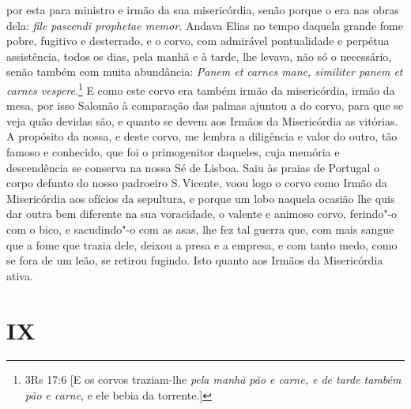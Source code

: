 por esta para ministro e irmão da sua misericórdia, senão porque o era
nas obras dela: \emph{file pascendi prophetae memor.} Andava Elias no
tempo daquela grande fome pobre, fugitivo e desterrado, e o corvo, com
admirável pontualidade e perpétua assistência, todos os dias, pela manhã
e à tarde, lhe levava, não só o necessário, senão também com muita
abundância: \emph{Panem et carnes mane, similiter panem et carnes vespere}.\footnote{3Rs 17:6 [E os corvos traziam-lhe \textit{pela manhã pão e carne, e de tarde também pão e carne}, e ele bebia da torrente.]} E como este corvo
era também irmão da misericórdia, irmão da mesa, por isso Salomão à
comparação das palmas ajuntou a do corvo, para que se veja quão devidas
são, e quanto se devem aos Irmãos da Misericórdia as vitórias. A
propósito da nossa, e deste corvo, me lembra a diligência e valor do
outro, tão famoso e conhecido, que foi o primogenitor daqueles, cuja
memória e descendência se conserva na nossa Sé de Lisboa. Saiu às praias
de Portugal o corpo defunto do nosso padroeiro S.\,Vicente, voou logo o
corvo como Irmão da Misericórdia aos ofícios da sepultura, e porque um
lobo naquela ocasião lhe quis dar outra bem diferente na sua voracidade,
o valente e animoso corvo, ferindo"-o com o bico, e sacudindo"-o com as
asas, lhe fez tal guerra que, com mais sangue que a fome que trazia
dele, deixou a presa e a empresa, e com tanto medo, como se fora de um
leão, se retirou fugindo. Isto quanto aos Irmãos da Misericórdia ativa.

\section{IX}


